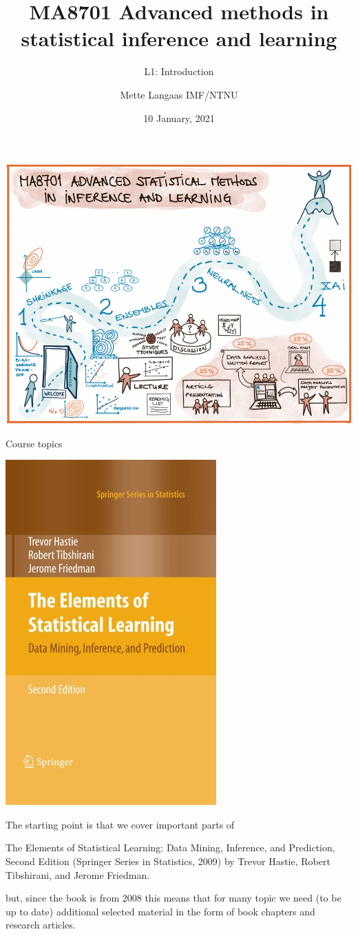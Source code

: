 \documentclass[
  ignorenonframetext,
]{beamer}
\title{MA8701 Advanced methods in statistical inference and learning}
\subtitle{L1: Introduction}
\author{Mette Langaas IMF/NTNU}
\date{10 January, 2021}
\begin{document}
\frame{\titlepage}

\begin{frame}

\includegraphics{./overviewv1.png}

\end{frame}

\begin{frame}{Course topics}
\protect\hypertarget{course-topics}{}

\begin{flushleft}\includegraphics[width=0.2\linewidth]{ELSbookcover} \end{flushleft}

The starting point is that we cover important parts of

The Elements of Statistical Learning: Data Mining, Inference, and
Prediction, Second Edition (Springer Series in Statistics, 2009) by
Trevor Hastie, Robert Tibshirani, and Jerome Friedman.

but, since the book is from 2008 this means that for many topic we need
(to be up to date) additional selected material in the form of book
chapters and research articles.

\end{frame}
\end{document}
